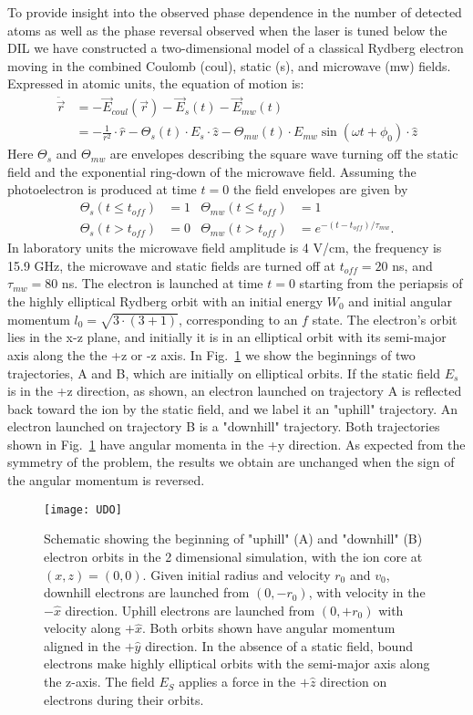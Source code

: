 \documentclass[aps,pra,preprint,groupedaddress]{revtex4-1}
\begin{document}
To provide insight into the observed phase dependence in the number of detected atoms as well as the phase reversal observed when the laser is tuned below the DIL we have constructed a two-dimensional model of a classical Rydberg electron moving in the combined Coulomb (coul), static (s), and microwave (mw) fields. Expressed in atomic units, the equation of motion is:
\begin{align*}
\ddot{\vec{r}} & = -\vec{E}_{coul}(\vec{r}) - \vec{E}_{s}(t) - \vec{E}_{mw}(t) \\
 & = -\frac{1}{r^2} \cdot \hat{r} - \Theta_s(t) \cdot E_{s} \cdot \hat{z} - \Theta_{mw}(t) \cdot E_{mw} \sin{(\omega t + \phi_0)} \cdot \hat{z}
\end{align*}
Here $\Theta_s$ and $\Theta_{mw}$ are envelopes describing the square wave turning off the static field and the exponential ring-down of the microwave field. Assuming the photoelectron is produced at time $t=0$ the field envelopes are given by
\begin{align*}
\Theta_s(t \leq t_{off}) & = 1 & \Theta_{mw}(t \leq t_{off}) & = 1 \\
\Theta_s(t > t_{off}) & = 0 & \Theta_{mw}(t > t_{off}) & = e^{-(t-t_{off})/\tau_{mw}}.
\end{align*}
In laboratory units the microwave field amplitude is 4 V/cm, the frequency is 15.9 GHz, the microwave and static fields are turned off at $t_{off} = 20$ ns, and $\tau_{mw} = 80$ ns. The electron is launched at time $t=0$ starting from the periapsis of the highly elliptical Rydberg orbit with an initial energy $W_0$ and initial angular momentum $l_0 = \sqrt{3 \cdot (3+1)}$, corresponding to an $f$ state. The electron's orbit lies in the x-z plane, and initially it is in an elliptical orbit with its semi-major axis along the the +z or -z axis. In Fig.~\ref{fig:udo} we show the beginnings of two trajectories, A and B, which are initially on elliptical orbits. If the static field $E_s$ is in the +z direction, as shown, an electron launched on trajectory A is reflected back toward the ion by the static field, and we label it an "uphill" trajectory. An electron launched on trajectory B is a "downhill" trajectory. Both trajectories shown in Fig.~\ref{fig:udo} have angular momenta in the +y direction. As expected from the symmetry of the problem, the results we obtain are unchanged when the sign of the angular momentum is reversed.


\begin{figure}
	\texttt{[image: UDO]}
	\caption{Schematic showing the beginning of "uphill" (A) and "downhill" (B) electron orbits in the 2 dimensional simulation, with the ion core at $(x, z) = (0, 0)$. Given initial radius and velocity $r_0$ and $v_0$, downhill electrons are launched from $(0, -r_0)$, with velocity in the $-\hat{x}$ direction. Uphill electrons are launched from $(0, +r_0)$ with velocity along $+\hat{x}$. Both orbits shown have angular momentum aligned in the $+\hat{y}$ direction. In the absence of a static field, bound electrons make highly elliptical orbits with the semi-major axis along the z-axis. The field $E_S$ applies a force in the $+\hat{z}$ direction on electrons during their orbits.}
	\label{fig:udo}
\end{figure}
\end{document}
